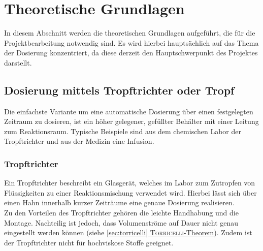 \section{Theoretische Grundlagen}
\label{sec:physik}
In diesem Abschnitt werden die theoretischen Grundlagen aufgeführt, die für die Projektbearbeitung notwendig sind. Es wird hierbei hauptsächlich auf das Thema der Dosierung konzentriert, da diese derzeit den Hauptschwerpunkt des Projektes darstellt.

\subsection{Dosierung mittels Tropftrichter oder Tropf}
Die einfachste Variante um eine automatische Dosierung über einen festgelegten Zeitraum zu dosieren, ist ein höher gelegener, gefüllter Behälter mit einer Leitung zum Reaktionsraum. Typische Beispiele sind aus dem chemischen Labor der Tropftrichter und aus der Medizin eine Infusion. 

\subsubsection*{Tropftrichter}
Ein Tropftrichter beschreibt ein Glasgerät, welches im Labor zum Zutropfen von Flüssigkeiten zu einer Reaktionsmischung verwendet wird. Hierbei lässt sich über einen Hahn innerhalb kurzer Zeiträume eine genaue Dosierung realisieren. \cite{Hunig.2006}\\
Zu den Vorteilen des Tropftrichter gehören die leichte Handhabung und die Montage. Nachteilig ist jedoch, dass Volumenströme auf Dauer nicht genau eingestellt werden können (siehe \hyperref[sec:torricelli]{\ref{sec:torricelli} \textsc{Torricelli}-Theorem}). Zudem ist der Tropftrichter nicht für hochviskose Stoffe geeignet.

